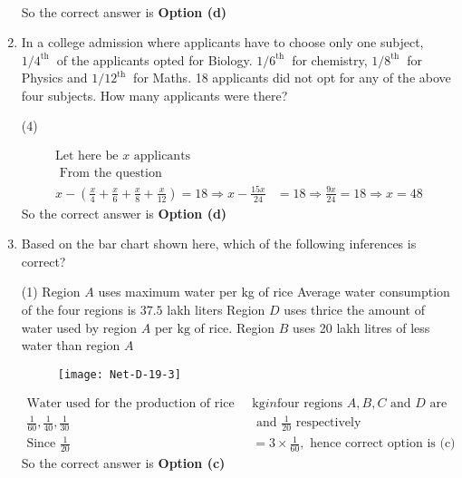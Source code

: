 \begin{enumerate}
\begin{answer}
\begin{align*}
	\end{align*}
		So the correct answer is \textbf{Option (d)}
\end{answer}
\item  In a college admission where applicants have to choose only one subject, $1 / 4^{\text {th }}$ of the applicants opted for Biology. $1 / 6^{\text {th }}$ for chemistry, $1 / 8^{\text {th }}$ for Physics and $1 / 12^{\text {th }}$ for Maths. 18 applicants did not opt for any of the above four subjects. How many applicants were there?	
 \begin{tasks}(4)
\end{tasks}	
\begin{answer}
	\begin{align*}
	\text{Let here be $x$ applicants}\\
\text{	From the question}\\
	x-\left(\frac{x}{4}+\frac{x}{6}+\frac{x}{8}+\frac{x}{12}\right)=18 \Rightarrow x-\frac{15 x}{24}&=18 \Rightarrow \frac{9 x}{24}=18 \Rightarrow x=48
	\end{align*}
	So the correct answer is \textbf{Option (d)}
\end{answer}
\item  Based on the bar chart shown here, which of the following inferences is correct?
 \begin{tasks}(1)
	\task[\textbf{a.}]Region $A$ uses maximum water per kg of rice
	\task[\textbf{b.}] Average water consumption of the four regions is
	$37.5$ lakh liters
	\task[\textbf{c.}] Region $D$ uses thrice the amount of water used by region $A$ per $\mathrm{kg}$ of rice.
	\task[\textbf{d.}]  Region $B$ uses 20 lakh litres of less water than region $A$
\end{tasks}	
\begin{figure}[H]
	\centering
	\texttt{[image: Net-D-19-3]}
\end{figure}
\begin{answer}
	\begin{align*}
	 \text{Water used for the production of rice per }&\mathrm{kg} in \text{four regions $A, B, C$ and $D$ are} \\
	 \frac{1}{60}, \frac{1}{40}, \frac{1}{30}&\text{ and }\frac{1}{20}\text{ respectively}\\
	\text{Since }\frac{1}{20}&=3 \times \frac{1}{60},\text{ hence correct option is (c)}
	\end{align*}
		So the correct answer is \textbf{Option (c)}

\end{answer}
\end{enumerate}
